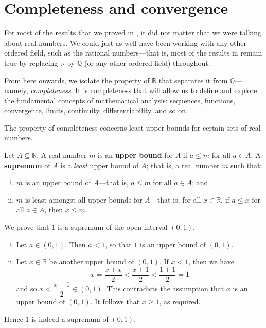 \section{Completeness and convergence}

For most of the results that we proved in , it did not matter that we were talking about real numbers. We could just as well have been working with any other ordered field, such as the rational numbers---that is, most of the results in  remain true by replacing $\mathbb{R}$ by $\mathbb{Q}$ (or any other ordered field) throughout.

From here onwards, we isolate the property of $\mathbb{R}$ that separates it from $\mathbb{Q}$---namely, \textit{completeness}. It is completeness that will allow us to define and explore the fundamental concepts of mathematical analysis: sequences, functions, convergence, limits, continuity, differentiability, and so on.

The property of completeness concerns least upper bounds for certain sets of real numbers.

\begin{definition}
\label{defSupremumOfSubsetOfR}
Let $A \subseteq \mathbb{R}$. A real number $m$ is an \textbf{upper bound} for $A$ if $a \le m$ for all $a \in A$. A \textbf{supremum} of $A$ is a \textit{least} upper bound of $A$; that is, a real number $m$ such that:
\begin{enumerate}[(i)]
\item $m$ is an upper bound of $A$---that is, $a \le m$ for all $a \in A$; and
\item $m$ is least amongst all upper bounds for $A$---that is, for all $x \in \mathbb{R}$, if $a \le x$ for all $a \in A$, then $x \le m$.
\end{enumerate}
\end{definition}

\begin{example}
We prove that $1$ is a supremum of the open interval $(0,1)$.
\begin{enumerate}[(i)]
\item Let $a \in (0,1)$. Then $a < 1$, so that $1$ is an upper bound of $(0,1)$.
\item Let $x \in \mathbb{R}$ be another upper bound of $(0,1)$. If $x < 1$, then we have
\[ x = \dfrac{x+x}{2} < \dfrac{x+1}{2} < \dfrac{1+1}{2} = 1 \]
and so $x < \dfrac{x+1}{2} \in (0,1)$. This contradicts the assumption that $x$ is an upper bound of $(0,1)$. It follows that $x \ge 1$, as required.
\end{enumerate}
Hence $1$ is indeed a supremum of $(0,1)$.
\end{example}


